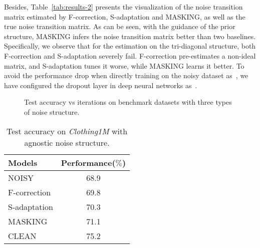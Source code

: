 \documentclass{article}
\begin{document}
Besides, Table~\ref{tab:results-2} presents the visualization of the noise transition matrix estimated by F-correction, S-adaptation and MASKING, as well as the true noise transition matrix. As can be seen, with the guidance of the prior structure, MASKING infers the noise transition matrix better than two baselines. Specifically, we observe that for the estimation on the tri-diagonal structure, both F-correction and S-adaptation severely fail. F-correction pre-estimates a non-ideal matrix, and S-adaptation tunes it worse, while MASKING learns it better. To avoid the performance drop when directly training on the noisy dataset as~\cite{jiang2017mentornet,arpit2017closer}, we have configured the dropout layer in deep neural networks as~\cite{arpit2017closer}.

\begin{figure}[ht]
\begin{center}
\caption{Test accuracy vs iterations on benchmark datasets with three types of noise structure.}
\label{fig:results}
\end{center}
\end{figure}

\begin{table}[ht]
  \caption{Test accuracy on \textit{Clothing1M} with agnostic noise structure.}
  \label{tab:results}
  \centering
  \begin{tabular}{lc}
    \toprule
    Models     & Performance($\%$)    \\
    \midrule
    NOISY & 68.9  \\
    F-correction & 69.8  \\
    S-adaptation & 70.3 \\
    MASKING & 71.1 \\
    \midrule
    CLEAN & 75.2 \\
    \bottomrule
  \end{tabular}
\end{table}
\end{document}
